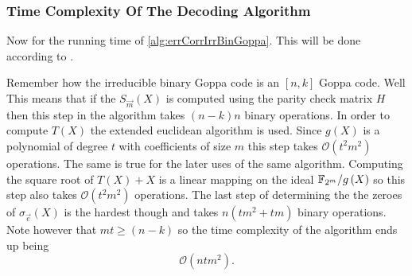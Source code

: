 \subsubsection{Time Complexity Of The Decoding Algorithm}
\label{subsubsec:runTimeOfEOSalgorithm}

Now for the running time of \cref{alg:errCorrIrrBinGoppa}. This will be done according to \cite{EOS}.

Remember how the irreducible binary Goppa code is an $\left[n,k\right]$ Goppa code. Well This means that if the $S_{\vec{m}}\left(X\right)$ is computed using the parity check matrix $H$ then this step in the algorithm takes $\left(n - k\right)n$ binary operations. In order to compute $T\left(X\right)$ the extended euclidean algorithm is used. Since $g\left(X\right)$ is a polynomial of degree $t$ with coefficients of size $m$ this step takes $\mathcal{O}\left(t^2 m^2\right)$ operations. The same is true for the later uses of the same algorithm. Computing the square root of $T\left(X\right) + X$ is a linear mapping on the ideal $\mathbb{F}_{2^m}/g\left(X\right)$ so this step also takes $\mathcal{O}\left(t^2 m^2\right)$ operations. The last step of determining the the zeroes of $\sigma_{\vec{e}}\left(X\right)$ is the hardest though and takes $n \left(tm^2 + tm\right)$ binary operations. Note however that $mt \geq \left(n-k\right)$ so the time complexity of the algorithm ends up being
\[
	\mathcal{O}\left(ntm^2\right).
\]

